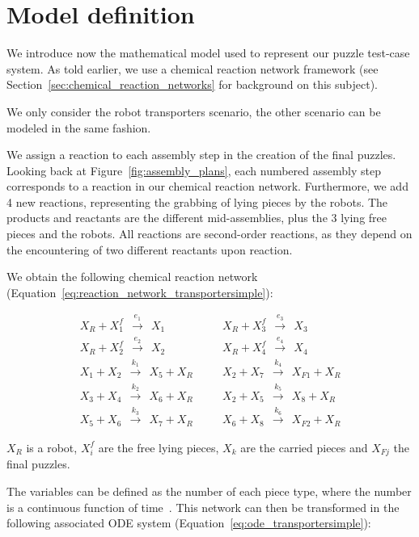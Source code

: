 
\section{Model definition} %
\label{sec:model_definition}
	We introduce now the mathematical model used to represent our puzzle test-case system. As told earlier, we use a chemical reaction network framework (see Section~\ref{sec:chemical_reaction_networks} for background on this subject).

	We only consider the robot transporters scenario, the other scenario can be modeled in the same fashion.
	
	We assign a reaction to each assembly step in the creation of the final puzzles. Looking back at Figure~\ref{fig:assembly_plans}, each numbered assembly step corresponds to a reaction in our chemical reaction network.
	Furthermore, we add 4 new reactions, representing the grabbing of lying pieces by the robots.
	The products and reactants are the different mid-assemblies, plus the 3 lying free pieces and the robots. All reactions are second-order reactions, as they depend on the encountering of two different reactants upon reaction.
	
	We obtain the following chemical reaction network (Equation~\eqref{eq:reaction_network_transportersimple}):
	
	\begin{eqnarray}
		X_R + X_1^f ~~\xrightarrow{e_1} ~~ X_1 & \quad  & X_R + X_3^f ~~\xrightarrow{e_3} ~~ X_3 \nonumber \\
		X_R + X_2^f ~~\xrightarrow{e_2} ~~ X_2 & & X_R + X_4^f ~~\xrightarrow{e_4} ~~ X_4 \nonumber \\
		X_1 + X_2 ~~\xrightarrow{k_1} ~~ X_5 + X_R &  &  X_2 + X_7 ~~ \xrightarrow{k_4} ~~ X_{F1} + X_R\nonumber \\
		X_3 + X_4 ~~\xrightarrow{k_2} ~~ X_6 + X_R& & X_2 + X_5	~~ \xrightarrow{k_5} ~~ X_{8} + X_R \nonumber \\
		X_5 + X_6 ~~\xrightarrow{k_3} ~~ X_7 + X_R & & X_6 + X_8 ~~ \xrightarrow{k_6} ~~ X_{F2} + X_R
	\label{eq:reaction_network_transportersimple}
	\end{eqnarray}
	
	$X_R$ is a robot, $X_i^f$ are the free lying pieces, $X_k$ are the carried pieces and $X_{Fj}$ the final puzzles.
	
	The variables can be defined as the number of each piece type, where the number is a continuous function of time~\cite{Gillespie:1977p5555}. This network can then be transformed in the following associated ODE system (Equation~\eqref{eq:ode_transportersimple}):
	
